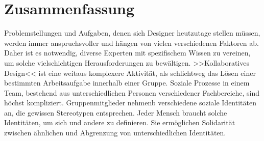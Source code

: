 \section*{Zusammenfassung}
Problemstellungen und Aufgaben, denen sich Designer heutzutage stellen müssen, werden immer anspruchsvoller und hängen von vielen verschiedenen Faktoren ab. Daher ist es notwendig, diverse Experten mit spezifischem Wissen zu vereinen, um solche vielschichtigen Herausforderungen zu bewältigen. >>Kollaboratives Design<< ist eine weitaus komplexere Aktivität, als schlichtweg das Lösen einer bestimmten Arbeitsaufgabe innerhalb einer Gruppe. Soziale Prozesse in einem Team, bestehend aus unterschiedlichen Personen verschiedener Fachbereiche, sind höchst kompliziert. Gruppenmitglieder nehmenb verschiedene soziale Identitäten an, die gewissen Stereotypen entsprechen. Jeder Mensch braucht solche Identitäten, um sich und andere zu definieren. Sie ermöglichen Solidarität zwischen ähnlichen und Abgrenzung von unterschiedlichen Identitäten.


